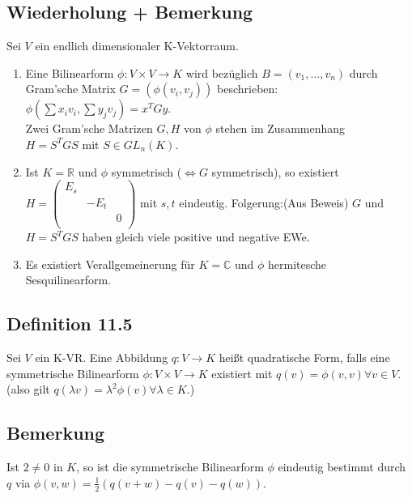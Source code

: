 \documentclass[a4paper, 12pt]{extarticle}
\begin{document}
\subsection*{Wiederholung + Bemerkung}
Sei $V$ ein endlich dimensionaler K-Vektorraum.
\begin{enumerate}[label=\alph*)]
	\item Eine Bilinearform $\phi: V \times V \longrightarrow K $ wird bezüglich $B = (v_1, ... , v_n)$ durch Gram'sche Matrix $G = (\phi (v_i,v_j))$ beschrieben:\\
	$\phi(\sum x_i v_i, \sum y_j v_j) = x^TGy$.\\
	Zwei Gram'sche Matrizen $G, H$ von $\phi$ stehen im Zusammenhang\\
	$H = S^TGS$ mit $S \in GL_n(K)$.
	\item Ist $K = \mathbb{R}$ und $\phi$ symmetrisch ($\Leftrightarrow G$ symmetrisch), so existiert\\
	$H = \left( \begin{matrix}
		E_s \\
		& -E_t \\
		& & 0\\
	\end{matrix} \right)$ mit $s,t$ eindeutig.
	Folgerung:(Aus Beweis) $G$ und $H = S^TGS$ haben gleich viele positive und negative EWe.
	\item Es existiert Verallgemeinerung für $K = \mathbb{C}$ und $\phi$ hermitesche Sesquilinearform.
\end{enumerate}
\subsection*{Definition 11.5}
Sei $V$ ein K-VR. Eine Abbildung $q:V \longrightarrow K$ heißt quadratische Form, falls eine symmetrische Bilinearform $\phi: V \times V \longrightarrow K$ existiert mit $q(v) = \phi(v,v) \forall v \in V$.\\
(also gilt $q(\lambda v)= \lambda^2\phi(v)\forall \lambda \in K$.)
\subsection*{Bemerkung}
Ist $2 \neq 0$ in $K$, so ist die symmetrische Bilinearform $\phi$ eindeutig bestimmt durch $q$ via $\phi(v,w) = \frac{1}{2}(q(v+w) - q(v) - q(w)).$
\end{document}
